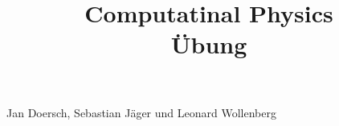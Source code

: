 \documentclass[a4paper, 12pt]{article}
\begin{document}
\title{
\textbf{Computatinal Physics\\
Übung}
}
\date{}
\maketitle

\begin{center}
Jan Doersch, Sebastian Jäger und Leonard Wollenberg
\end{center}




\newpage

\end{document}
